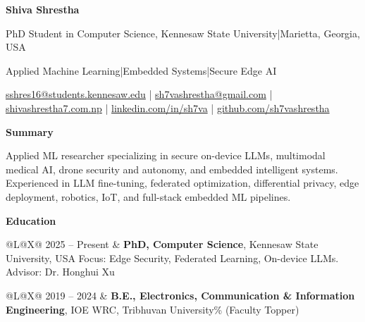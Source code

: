 \documentclass[letterpaper,10pt]{article}
\makeatletter
\newcommand{\sectiontitle}[1]{%
  \needspace{3\baselineskip}%
  \vspace{5pt}%
  {\color{accent}\large\bfseries #1}\par
  \vspace{1.5pt}{\color{accent}\hrule height 0.5pt}%
  \vspace{4pt}%
}
\newcommand{\cvrow}[2]{%
  \noindent\begin{tabularx}{\linewidth}{@{}L@{\hspace{0.14in}}X@{}}
    #1 & #2
  \end{tabularx}\par\vspace{3pt}%
}
\makeatother
\begin{document}
{\fontsize{24}{26}\selectfont\bfseries\color{accent} Shiva Shrestha}\par
\vspace{3pt}
{\normalsize PhD Student in Computer Science, Kennesaw State University\enspace\textcolor{muted}{|}\enspace Marietta, Georgia, USA}\par
\vspace{1pt}
{\small\color{muted} Applied Machine Learning\enspace|\enspace Embedded Systems\enspace|\enspace Secure Edge AI}\par
\vspace{3pt}
{\footnotesize
  \href{mailto:sshres16@students.kennesaw.edu}{sshres16@students.kennesaw.edu}
  \enspace\textcolor{muted}{|}\enspace
  \href{mailto:sh7vashrestha@gmail.com}{sh7vashrestha@gmail.com}
  \enspace\textcolor{muted}{|}\enspace
  \href{https://shivashrestha7.com.np}{shivashrestha7.com.np}
  \enspace\textcolor{muted}{|}\enspace
  \href{https://linkedin.com/in/sh7va}{linkedin.com/in/sh7va}
  \enspace\textcolor{muted}{|}\enspace
  \href{https://github.com/sh7vashrestha}{github.com/sh7vashrestha}
}\par

\sectiontitle{Summary}
Applied ML researcher specializing in secure on-device LLMs, multimodal medical AI, drone security and autonomy, and embedded intelligent systems. Experienced in LLM fine-tuning, federated optimization, differential privacy, edge deployment, robotics, IoT, and full-stack embedded ML pipelines.

\sectiontitle{Education}
\cvrow{2025 -- Present}{\textbf{PhD, Computer Science}, Kennesaw State University, USA\newline
  Focus: Edge Security, Federated Learning, On-device LLMs. Advisor: Dr. Honghui Xu}
\cvrow{2019 -- 2024}{\textbf{B.E., Electronics, Communication \& Information Engineering}, IOE WRC, Tribhuvan University\newline
  82.32\% (Faculty Topper)}
\end{document}
